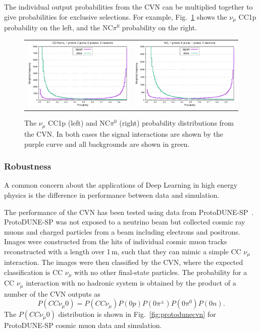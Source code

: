 The individual output probabilities from the CVN can be multiplied together to give probabilities for exclusive selections. For example, Fig.~\ref{fig:exclusive} shows the $\nu_\mu$ CC1p probability on the left, and the NC$\pi^0$ probability on the right.
\begin{figure}
    \centering
    \begin{tabular}{cc}
		\includegraphics[width=0.475\linewidth]{graphics/cvn_numu1proton0pions0pizeros.eps} &
		\includegraphics[width=0.475\linewidth]{graphics/cvn_nc1proton0pions1pizeros.eps} 
	\end{tabular}
	\caption{The $\nu_\mu$ CC1p (left) and NC$\pi^0$ (right) probability distributions from the CVN. In both cases the signal interactions are shown by the purple curve and all backgrounds are shown in green.}
    \label{fig:exclusive}
\end{figure}

\subsubsection{Robustness}
A common concern about the applications of Deep Learning in high energy physics is the difference in performance between data and simulation.

The performance of the CVN has been tested using data from ProtoDUNE-SP~\cite{Abi:2017aow}. ProtoDUNE-SP was not exposed to a neutrino beam but collected cosmic ray muons and charged particles from a beam including electrons and positrons. Images were constructed from the hits of individual cosmic muon tracks reconstructed with a length over 1\,m, such that they can mimic a simple CC $\nu_\mu$ interaction. The images were then classified by the CVN, where the expected classification is CC $\nu_\mu$ with no other final-state particles. The probability for a CC $\nu_\mu$ interaction with no hadronic system is obtained by the product of a number of the CVN outputs as
\begin{equation}
P(CC\nu_\mu0) = P(CC\nu_\mu)P(0p)P(0\pi^\pm)P(0\pi^0)P(0n).    
\end{equation} 
The $P(CC\nu_\mu0)$ distribution is shown in Fig.~\ref{fig:protodunecvn} for ProtoDUNE-SP cosmic muon data and simulation.

